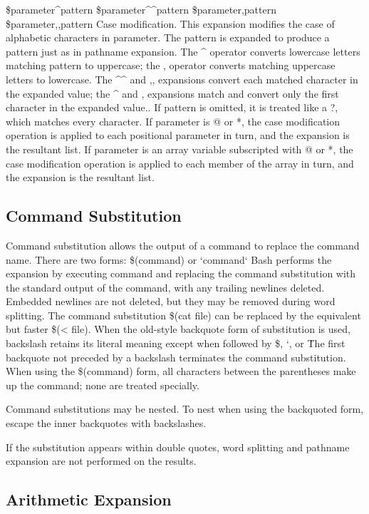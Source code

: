 \${parameter\^{}pattern}
\${parameter\^{}\^{}pattern}
\${parameter,pattern}
\${parameter,,pattern}
Case modification. This expansion modifies the case of alphabetic characters in parameter. The pattern is expanded to produce a pattern just as in pathname expansion. The \^{} operator converts lowercase letters matching pattern to uppercase; the , operator converts matching uppercase letters to lowercase. The \^{}\^{} and ,, expansions convert each matched character in the expanded value; the \^{} and , expansions match and convert only the first character in the expanded value.. If pattern is omitted, it is treated like a ?, which matches every character. If parameter is @ or *, the case modification operation is applied to each positional parameter in turn, and the expansion is the resultant list. If parameter is an array variable subscripted with @ or *, the case modification operation is applied to each member of the array in turn, and the expansion is the resultant list.

\subsection{Command Substitution}\label{sec:commandsubsitution}

Command substitution allows the output of a command to replace the command name. There are two forms:
\$(command)
or
`command`
Bash performs the expansion by executing command and replacing the command substitution with the standard output of the command, with any trailing newlines deleted. Embedded newlines are not deleted, but they may be removed during word splitting. The command substitution \$(cat file) can be replaced by the equivalent but faster \$(< file).
When the old-style backquote form of substitution is used, backslash retains its literal meaning except when followed by \$, `, or \. The first backquote not preceded by a backslash terminates the command substitution. When using the \$(command) form, all characters between the parentheses make up the command; none are treated specially.

Command substitutions may be nested. To nest when using the backquoted form, escape the inner backquotes with backslashes.

If the substitution appears within double quotes, word splitting and pathname expansion are not performed on the results.

\subsection{Arithmetic Expansion}\label{sec:arithmeticexpansion}


